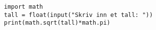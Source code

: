 %
%
\begin {lstlisting}
import math
tall = float(input("Skriv inn et tall: "))
print(math.sqrt(tall)*math.pi)
\end{lstlisting}
